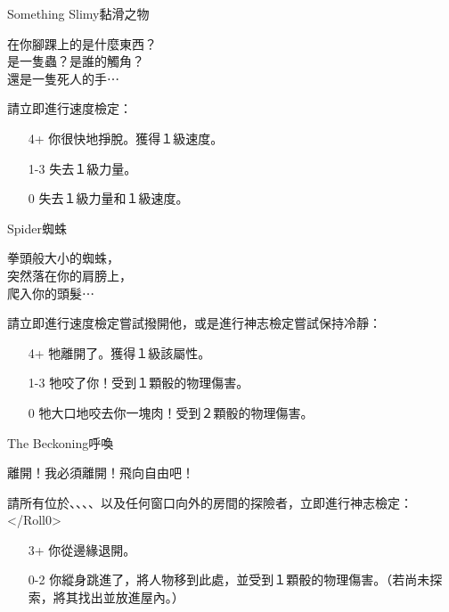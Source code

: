 \begin{EventCard}{Something Slimy}{黏滑之物}

  \begin{CardStory}
    在你腳踝上的是什麼東西？\\
    是一隻蟲？是誰的觸角？\\
    還是一隻死人的手⋯
  \end{CardStory}

  請立即進行速度檢定：
  \begin{itemize}
    \item[4+] 你很快地掙脫。獲得１級速度。
    \item[1-3] 失去１級力量。
    \item[0] 失去１級力量和１級速度。
  \end{itemize}

\end{EventCard}%
%
\begin{EventCard}{Spider}{蜘蛛}

  \begin{CardStory}
    拳頭般大小的蜘蛛，\\
    突然落在你的肩膀上，\\
    爬入你的頭髮⋯
  \end{CardStory}

  請立即進行速度檢定嘗試撥開他，或是進行神志檢定嘗試保持冷靜：
  \begin{itemize}
    \item[4+] 牠離開了。獲得１級該屬性。
    \item[1-3] 牠咬了你！受到１顆骰的物理傷害。
    \item[0] 牠大口地咬去你一塊肉！受到２顆骰的物理傷害。
  \end{itemize}

\end{EventCard}%
%
\begin{EventCard}{The Beckoning}{呼喚}

  \begin{CardStory}
    離開！我必須離開！飛向自由吧！
  \end{CardStory}

  請所有位於、、、、以及任何窗口向外的房間的探險者，立即進行神志檢定：</Roll0>
  \begin{itemize}
    \item[3+] 你從邊緣退開。
    \item[0-2] 你縱身跳進了，將人物移到此處，並受到１顆骰的物理傷害。（若尚未探索，將其找出並放進屋內。）
  \end{itemize}

\end{EventCard}%
